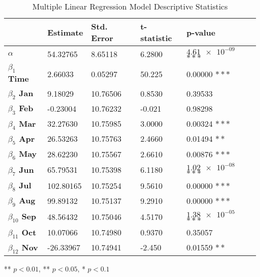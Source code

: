 \documentclass{article}
\begin{document}
\begin{table}[H]
    \centering
        \begin{threeparttable}
            \begin{tabular}{l l l l l}
              \toprule & \textbf{Estimate} & \textbf{Std. Error} & \textbf{t-statistic} & \textbf{p-value} \\ \midrule
            \textbf{$\alpha$} & 54.32765 & 8.65118 & 6.2800 & $\num{4.61e-09}$ $***$ \\ 
            \textbf{$\beta_1$ Time} & 2.66033 & 0.05297 & 50.225 & 0.00000 $***$ \\ 
            \textbf{$\beta_2$ Jan} & 9.18029 & 10.76506 & 0.8530 & 0.39533  \\ 
            \textbf{$\beta_3$ Feb} & -0.23004 & 10.76232 & -0.021 & 0.98298 \\ 
            \textbf{$\beta_4$ Mar} & 32.27630 & 10.75985 & 3.0000 & 0.00324 $***$ \\ 
            \textbf{$\beta_5$ Apr} & 26.53263 & 10.75763 & 2.4660 & 0.01494 $**$ \\ 
            \textbf{$\beta_6$ May} & 28.62230 & 10.75567 & 2.6610 & 0.00876 $***$ \\ 
            \textbf{$\beta_7$ Jun} & 65.79531 & 10.75398 & 6.1180 & $\num{1.02e-08}$ $***$ \\ 
            \textbf{$\beta_8$ Jul} & 102.80165 & 10.75254 & 9.5610 & 0.00000 $***$ \\ 
            \textbf{$\beta_9$ Aug} & 99.89132 & 10.75137 & 9.2910 & 0.00000 $***$ \\ 
            \textbf{$\beta_{10}$ Sep} & 48.56432 & 10.75046 & 4.5170 & $\num{1.38e-05}$ $***$ \\ 
            \textbf{$\beta_{11}$ Oct} & 10.07066 & 10.74980 & 0.9370 & 0.35057 \\ 
            \textbf{$\beta_{12}$ Nov} & -26.33967 & 10.74941 & -2.450 & 0.01559 $**$\\ \bottomrule
            \end{tabular}
            \begin{tablenotes}
                \small
                \item *** $p < 0.01$, ** $p < 0.05$, * $p < 0.1$
            \end{tablenotes}
        \end{threeparttable}
    \caption{\label{descriptivestats}Multiple Linear Regression Model Descriptive Statistics}
\end{table}
\end{document}
